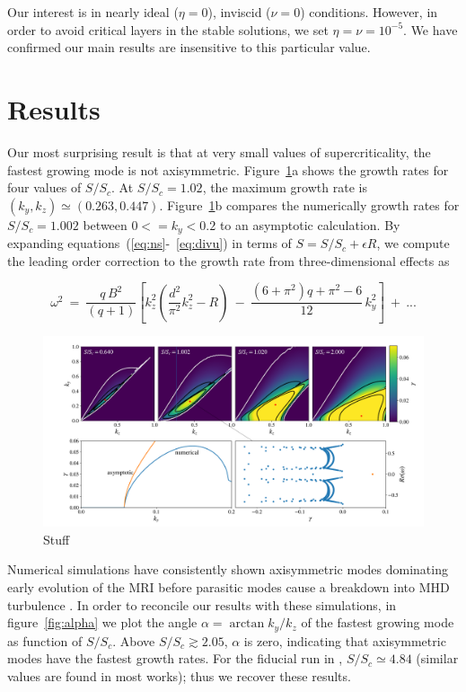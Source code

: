 \documentclass[aps,prl,reprint,superscriptaddress]{revtex4-1}
\newcommand{\SSC}{S/S_{c}}
\begin{document}
Our interest is in nearly ideal ($\eta = 0$), inviscid ($\nu = 0$) conditions.
However, in order to avoid critical layers in the stable solutions, we set $\eta=\nu=10^{-5}$.
We have confirmed our main results are insensitive to this particular value. 

\section{Results}
\label{sec:results}
Our most surprising result is that at very small values of supercriticality, the fastest growing mode is not axisymmetric. 
Figure~\ref{fig:growth_rate}a shows the growth rates for four values of $\SSC$. 
At $\SSC = 1.02$, the maximum growth rate is $(k_y, k_z) \simeq (0.263, 0.447)$.
Figure~\ref{fig:growth_rate}b compares the numerically growth rates for $\SSC=1.002$ between $0 <= k_y < 0.2$ to an asymptotic calculation.
By expanding equations~(\ref{eq:ns}-~\ref{eq:divu}) in terms of $S = \SSC + \epsilon R$, we compute the leading order correction to the growth rate from three-dimensional effects as
\begin{widetext}
\begin{equation}
  \label{eq:asymp}
\omega^{2} \ = \ \frac{q\,B^{2}}{(q+1)} \left[ k_z^2 \left(\frac{d^2}{\pi^{2}} k_z^2-R\right) \ - \ \frac{\left(6+\pi ^2\right) q+\pi
   ^2-6}{12 } \, k_{y}^{2}  \right] \ + \ ...
\end{equation}
\end{widetext}
%
\onecolumngrid

\begin{figure}[b!]
  \includegraphics[width=\textwidth]{fig_1.pdf}
  \caption{Stuff}
  \label{fig:growth_rate}
\end{figure}
\twocolumngrid
%
Numerical simulations have consistently shown axisymmetric modes dominating early evolution of the MRI before parasitic modes cause a breakdown into MHD turbulence \citep[e.g.][]{1995ApJ...440..742H,2018ApJ...853..174H,2019ApJS..241...26D}. 
In order to reconcile our results with these simulations, in figure~\ref{fig:alpha} we plot the angle $\alpha = \arctan k_y/k_z$ of the fastest growing mode as function of $\SSC$.
Above $\SSC \gtrsim 2.05$, $\alpha$ is zero, indicating that axisymmetric modes have the fastest growth rates.
For the fiducial run in \citet{1996ApJ...464..690H}, $\SSC \simeq 4.84$ (similar values are found in most works); thus we recover these results.
\end{document}
